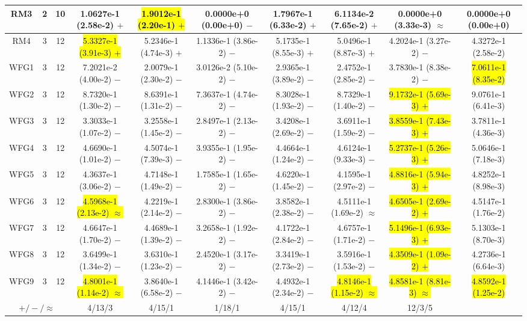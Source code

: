 \documentclass[journal]{IEEEtran}
\begin{document}
\begin{table*}[htbp]
\begin{tabular}{cccccccccc}
\hline
\multirow{1}{*}{RM3}&2&10&1.0627e-1 (2.58e-2) $+$&\hl{1.9012e-1 (2.20e-1) $+$}&0.0000e+0 (0.00e+0) $-$&1.7967e-1 (6.33e-2) $+$&6.1134e-2 (7.65e-2) $+$&0.0000e+0 (3.33e-3) $\approx$&0.0000e+0 (0.00e+0)\\
\hline
\multirow{1}{*}{RM4}&3&12&\hl{5.3327e-1 (3.91e-3) $+$}&5.2346e-1 (4.74e-3) $+$&1.1336e-1 (3.86e-2) $-$&5.1735e-1 (8.55e-3) $+$&5.0496e-1 (8.87e-3) $+$&4.2024e-1 (3.27e-2) $-$&4.3272e-1 (2.58e-2)\\
\hline
\multirow{1}{*}{WFG1}&3&12&7.2021e-2 (4.00e-2) $-$&2.0079e-1 (2.30e-2) $-$&3.0126e-2 (5.10e-2) $-$&2.9365e-1 (3.89e-2) $-$&2.4752e-1 (2.85e-2) $-$&3.7830e-1 (8.38e-2) $-$&\hl{7.0611e-1 (8.35e-2)}\\
\hline
\multirow{1}{*}{WFG2}&3&12&8.7320e-1 (1.30e-2) $-$&8.6391e-1 (1.31e-2) $-$&7.3637e-1 (4.74e-2) $-$&8.3028e-1 (1.93e-2) $-$&8.7329e-1 (1.40e-2) $-$&\hl{9.1732e-1 (5.69e-3) $+$}&9.0761e-1 (6.41e-3)\\
\hline
\multirow{1}{*}{WFG3}&3&12&3.3033e-1 (1.07e-2) $-$&3.2558e-1 (1.45e-2) $-$&2.8497e-1 (2.13e-2) $-$&3.4208e-1 (2.69e-2) $-$&3.6911e-1 (1.59e-2) $-$&\hl{3.8559e-1 (7.43e-3) $+$}&3.7811e-1 (4.36e-3)\\
\hline
\multirow{1}{*}{WFG4}&3&12&4.6690e-1 (1.01e-2) $-$&4.5074e-1 (7.39e-3) $-$&3.9355e-1 (1.95e-2) $-$&4.4664e-1 (1.24e-2) $-$&4.6124e-1 (9.33e-3) $-$&\hl{5.2737e-1 (5.26e-3) $+$}&5.0646e-1 (7.18e-3)\\
\hline
\multirow{1}{*}{WFG5}&3&12&4.3637e-1 (3.06e-2) $-$&4.7148e-1 (1.49e-2) $-$&1.7585e-1 (1.65e-2) $-$&4.6220e-1 (1.45e-2) $-$&4.1595e-1 (2.97e-2) $-$&\hl{4.8816e-1 (5.94e-3) $+$}&4.8252e-1 (8.98e-3)\\
\hline
\multirow{1}{*}{WFG6}&3&12&\hl{4.5968e-1 (2.13e-2) $\approx$}&4.2219e-1 (2.14e-2) $-$&2.8300e-1 (3.86e-2) $-$&3.8582e-1 (2.38e-2) $-$&4.5111e-1 (1.69e-2) $\approx$&\hl{4.6505e-1 (2.69e-2) $+$}&4.5147e-1 (1.76e-2)\\
\hline
\multirow{1}{*}{WFG7}&3&12&4.6647e-1 (1.70e-2) $-$&4.4689e-1 (1.39e-2) $-$&3.2658e-1 (1.92e-2) $-$&4.1722e-1 (2.84e-2) $-$&4.6757e-1 (1.71e-2) $-$&\hl{5.1496e-1 (6.93e-3) $+$}&5.1303e-1 (8.70e-3)\\
\hline
\multirow{1}{*}{WFG8}&3&12&3.6499e-1 (1.34e-2) $-$&3.6310e-1 (1.23e-2) $-$&2.4520e-1 (3.17e-2) $-$&3.3419e-1 (2.73e-2) $-$&3.5916e-1 (1.53e-2) $-$&\hl{4.3509e-1 (1.09e-2) $+$}&4.2736e-1 (6.64e-3)\\
\hline
\multirow{1}{*}{WFG9}&3&12&\hl{4.8001e-1 (1.14e-2) $\approx$}&3.8640e-1 (6.58e-2) $-$&4.1446e-1 (3.42e-2) $-$&4.4932e-1 (2.34e-2) $-$&\hl{4.8146e-1 (1.15e-2) $\approx$}&\hl{4.8581e-1 (8.81e-3) $\approx$}&\hl{4.8592e-1 (1.25e-2)}\\
\hline
\multicolumn{3}{c}{$+/-/\approx$}&4/13/3&4/15/1&1/18/1&4/15/1&4/12/4&12/3/5&\\
\bottomrule
\end{tabular}
\label{No Label}
\end{table*}
\end{document}
